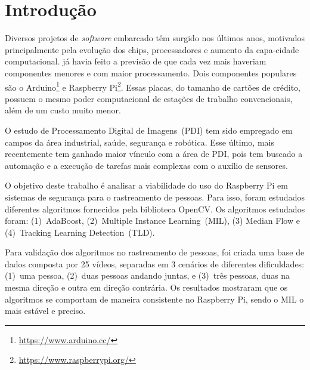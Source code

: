 \documentclass[12pt,oneside,a4paper,chapter=TITLE,section=TITLE,sumario=tradicional]{abntex2}
\begin{document}
\sumario

\textual

\chapter{Introdução}
\label{cap:introducao}

Diversos projetos de \textit{software} embarcado têm surgido nos últimos anos, motivados principalmente pela evolução dos chips, processadores e aumento da capa-cidade computacional.   já havia feito a previsão de que cada vez mais haveriam componentes menores e com maior processamento. Dois componentes populares são o Arduino\footnote{\url{https://www.arduino.cc/}} e Raspberry Pi\footnote{\url{https://www.raspberrypi.org/}}.  Essas placas, do tamanho de cartões de crédito, possuem o mesmo poder computacional de estações de trabalho convencionais, além de um custo muito menor. 

O estudo de Processamento Digital de Imagens~(PDI) tem sido empregado em campos da área industrial, saúde, segurança e robótica. Esse último, mais recentemente tem ganhado maior vínculo com a área de PDI, pois tem buscado a automação e a execução de tarefas mais complexas com o auxílio de sensores.

O objetivo deste trabalho é analisar a viabilidade do uso do Raspberry Pi em sistemas de segurança para o rastreamento de pessoas. Para isso, foram estudados diferentes algoritmos fornecidos pela biblioteca OpenCV. Os algoritmos estudados foram: (1)~AdaBoost, (2)~Multiple Instance Learning~(MIL), (3) Median Flow e (4)~Tracking Learning Detection~(TLD). 

Para validação dos algoritmos no rastreamento de pessoas, foi criada uma base de dados composta por 25 vídeos, separadas em 3 cenários de diferentes dificuldades: (1)~uma pessoa, (2)~duas pessoas andando juntas, e (3)~três pessoas, duas na mesma direção e outra em direção contrária. Os resultados mostraram que os algoritmos se comportam de maneira consistente no Raspberry Pi, sendo o MIL o mais estável e preciso.
\end{document}
